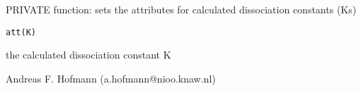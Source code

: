 \documentclass{article}
\begin{document}
\begin{Description}\relax
PRIVATE function: sets the attributes for calculated dissociation constants (Ks)
\end{Description}
\begin{Usage}
\begin{verbatim}att(K)\end{verbatim}
\end{Usage}
\begin{Arguments}
\begin{ldescription}
\item[\code{K }] the calculated dissociation constant K
\end{ldescription}
\end{Arguments}
\begin{Author}\relax
Andreas F. Hofmann (a.hofmann@nioo.knaw.nl)
\end{Author}
\end{document}
